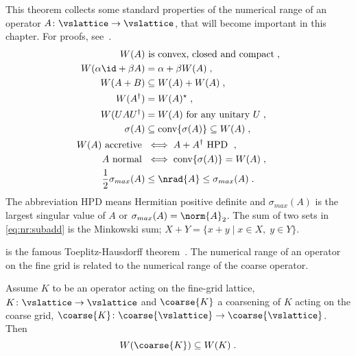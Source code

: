 \begin{theorem} \label{thm:nr:properties}
This theorem collects some standard properties of the numerical range of an operator $A \colon \vslattice \rightarrow \vslattice$, that will become important in this chapter.
For proofs, see~\cite{gustafson1997numerical}.
\begin{align}
    W(A) &\text{ is convex, closed and compact} \;,              		\label{eq:nr:convex}    \\
    W(\alpha \id + \beta A) &= \alpha + \beta W(A) \;,           		\label{eq:nr:linear}    \\
    W(A + B) &\subseteq W(A) + W(A) \;,                          		\label{eq:nr:subadd}    \\
    W(A^{\dagger}) &= W(A)^{\star} \;,                           		\label{eq:nr:dagger}    \\
    W(U A U^{\dagger}) &= W(A) \text{ for any unitary $U$} \;,   		\label{eq:nr:unitary}   \\
    \sigma(A) &\subseteq \convshull{A} \subseteq W(A) \;,        		\label{eq:nr:convhull}  \\
    W(A) \text{ accretive } &\iff A+A^{\dagger} \text{ HPD } \;, 		\label{eq:nr:accretive} \\
    A \text{ normal } &\iff \convshull{A} = W(A) \;,             		\label{eq:nr:normal}    \\
    \frac{1}{2} \sigma_{max}(A) &\leq \nrad{A} \leq \sigma_{max}(A) \;.		\label{eq:nr:max:sing:val}
\end{align}
The abbreviation HPD means Hermitian positive definite and $\sigma_{max}(A)$ is the largest singular value of $A$ or $\sigma_{max}(A) = \norm{A}_2$.
The sum of two sets in \cref{eq:nr:subadd} is the Minkowski sum; $X+Y = \{x+y \mid x \in X, \; y \in Y\}$.
\end{theorem}

 is the famous Toeplitz-Hausdorff theorem~\cite{toeplitz1918algebraische,hausdorff1919wertvorrat}.
The numerical range of an operator on the fine grid is related to the numerical range of the coarse operator.

\begin{theorem} \label{thm:numerical:range}
Assume $K$ to be an operator acting on the fine-grid lattice, $K \colon \vslattice \rightarrow \vslattice$ and $\coarse{K}$ a coarsening of $K$ acting on the coarse grid, $\coarse{K} \colon \coarse{\vslattice} \rightarrow \coarse{\vslattice}$.
Then
\begin{equation}
W(\coarse{K}) \subseteq W(K) \;.
\end{equation}
\end{theorem}

